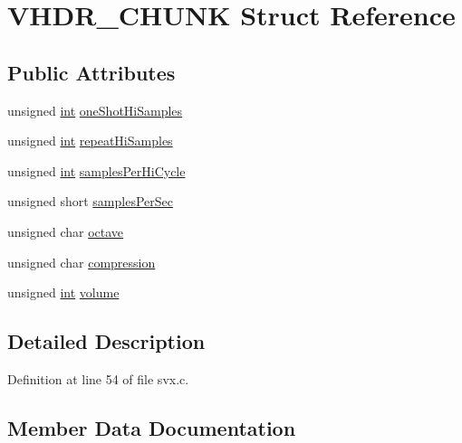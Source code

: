 \hypertarget{struct_v_h_d_r___c_h_u_n_k}{}\section{V\+H\+D\+R\+\_\+\+C\+H\+U\+NK Struct Reference}
\label{struct_v_h_d_r___c_h_u_n_k}
\subsection*{Public Attributes}
\begin{DoxyCompactItemize}
\item 
unsigned \hyperlink{xmltok_8h_a5a0d4a5641ce434f1d23533f2b2e6653}{int} \hyperlink{struct_v_h_d_r___c_h_u_n_k_ad8306e8a8c66099b11418c86ed6fb97f}{one\+Shot\+Hi\+Samples}
\item 
unsigned \hyperlink{xmltok_8h_a5a0d4a5641ce434f1d23533f2b2e6653}{int} \hyperlink{struct_v_h_d_r___c_h_u_n_k_a95a51d319c5be4b7cb88021473620539}{repeat\+Hi\+Samples}
\item 
unsigned \hyperlink{xmltok_8h_a5a0d4a5641ce434f1d23533f2b2e6653}{int} \hyperlink{struct_v_h_d_r___c_h_u_n_k_a05f99b9aef9560aa59179a5baeb2782c}{samples\+Per\+Hi\+Cycle}
\item 
unsigned short \hyperlink{struct_v_h_d_r___c_h_u_n_k_ae141fa3e2a732546d4fa04c3503b3747}{samples\+Per\+Sec}
\item 
unsigned char \hyperlink{struct_v_h_d_r___c_h_u_n_k_a26d86b8a0d41ee0a27d15dd4348cfa1b}{octave}
\item 
unsigned char \hyperlink{struct_v_h_d_r___c_h_u_n_k_a0cd23287b962d8cdc586df4a46d37f60}{compression}
\item 
unsigned \hyperlink{xmltok_8h_a5a0d4a5641ce434f1d23533f2b2e6653}{int} \hyperlink{struct_v_h_d_r___c_h_u_n_k_a1a7e8f95172e3f507b298355d778644f}{volume}
\end{DoxyCompactItemize}


\subsection{Detailed Description}


Definition at line 54 of file svx.\+c.



\subsection{Member Data Documentation}
